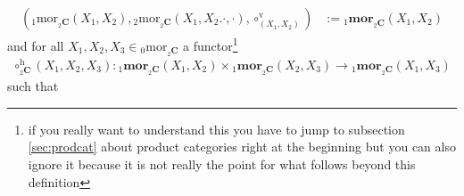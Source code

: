 \begin{align*}
  \left(
    {}_{1}\mathrm{mor}_{{}_{2}\mathbf{C}}(X_{1},X_{2}),
    {}_{2}\mathrm{mor}_{{}_{2}\mathbf{C}}(X_{1},X_{2}.\cdot,\cdot),
    \circ_{(X_{1},X_{2})}^{\textrm{v}}
  \right)
  &:=
  {}_{1}\mathbf{mor}_{{}_{2}\mathbf{C}}(X_{1},X_{2})
\end{align*}
and for all $X_{1},X_{2},X_{3} \in {}_{0}\mathrm{mor}_{{}_{2}\mathbf{C}}$ a functor\footnote{if you really want to understand this you have to jump to subsection \ref{sec:prodcat} about product categories right at the beginning but you can also ignore it because it is not really the point for what follows beyond this definition}
\begin{align*}
  \circ_{{}_{2}{\mathbf{C}}}^{\textrm{h}}(X_{1},X_{2},X_{3})
  \colon
  {}_{1}\mathbf{mor}_{{}_{2}\mathbf{C}}(X_{1},X_{2})
  \times
  {}_{1}\mathbf{mor}_{{}_{2}\mathbf{C}}(X_{2},X_{3})
  \rightarrow
  {}_{1}\mathbf{mor}_{{}_{2}\mathbf{C}}(X_{1},X_{3})
\end{align*}
such that
